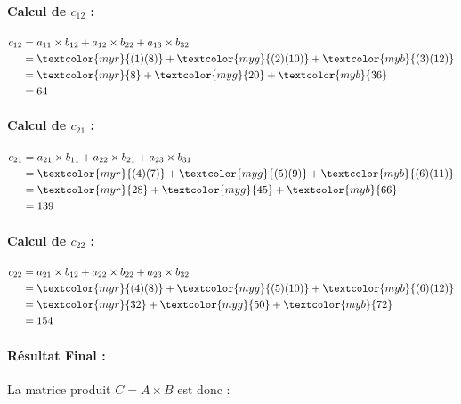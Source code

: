\documentclass{report}
\begin{document}
\begin{multicols*}{2}
\paragraph{Calcul de \( c_{12} \) :}

\begin{align*}
    c_{12} &= a_{11} \times b_{12} + a_{12} \times b_{22} + a_{13} \times b_{32} \\
           &= \textcolor{myr}{(1)(8)} + \textcolor{myg}{(2)(10)} + \textcolor{myb}{(3)(12)} \\
           &= \textcolor{myr}{8} + \textcolor{myg}{20} + \textcolor{myb}{36} \\
           &= 64
\end{align*}

\paragraph{Calcul de \( c_{21} \) :}

\begin{align*}
    c_{21} &= a_{21} \times b_{11} + a_{22} \times b_{21} + a_{23} \times b_{31} \\
           &= \textcolor{myr}{(4)(7)} + \textcolor{myg}{(5)(9)} + \textcolor{myb}{(6)(11)} \\
           &= \textcolor{myr}{28} + \textcolor{myg}{45} + \textcolor{myb}{66} \\
           &= 139
\end{align*}

\paragraph{Calcul de \( c_{22} \) :}

\begin{align*}
    c_{22} &= a_{21} \times b_{12} + a_{22} \times b_{22} + a_{23} \times b_{32} \\
           &= \textcolor{myr}{(4)(8)} + \textcolor{myg}{(5)(10)} + \textcolor{myb}{(6)(12)} \\
           &= \textcolor{myr}{32} + \textcolor{myg}{50} + \textcolor{myb}{72} \\
           &= 154
\end{align*}

\paragraph{Résultat Final :}

La matrice produit \( C = A \times B \) est donc :


\end{multicols*}
\end{document}
